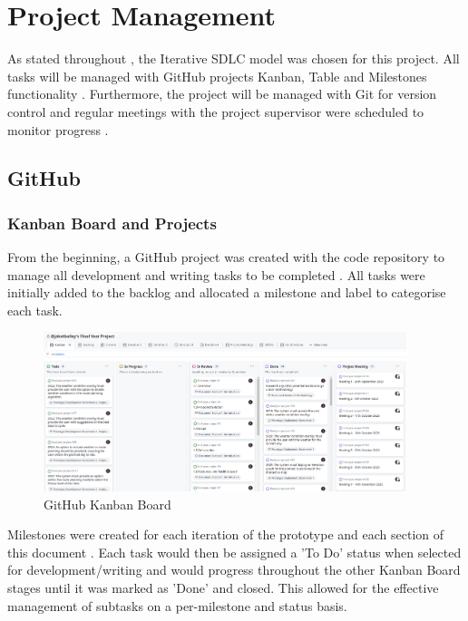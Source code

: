 \chapter{Project Management}
\label{chap:pm}

As stated throughout , the Iterative SDLC model was chosen for this project. All tasks will be managed with GitHub projects Kanban, Table and Milestones functionality . Furthermore, the project will be managed with Git for version control  and regular meetings with the project supervisor were scheduled to monitor progress .

\section{GitHub}

\subsection{Kanban Board and Projects}
\label{pm:kanban}

From the beginning, a GitHub project was created with the code repository to manage all development and writing tasks to be completed . All tasks were initially added to the backlog and allocated a milestone and label to categorise each task.

\begin{figure}
    \centering
    \includegraphics[width=400px]{figures/kanban.png}
    \caption{GitHub Kanban Board}
    \label{fig:kanban}
\end{figure}

Milestones were created for each iteration of the prototype and each section of this document . Each task would then be assigned a 'To Do' status when selected for development/writing and would progress throughout the other Kanban Board stages until it was marked as 'Done' and closed. This allowed for the effective management of subtasks on a per-milestone and status basis.

